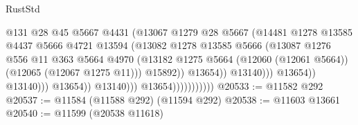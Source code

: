 \begin{lexlean}{RustStd}
\begin{coremodule}
                                                    @131
                                                    @28
                                                    @45
                                                    @5667
                                                    @4431
                                                    (@13067
                                                      @1279
                                                      @28
                                                      @5667
                                                      (@14481
                                                        @1278
                                                        @13585
                                                        @4437
                                                        @5666
                                                        @4721
                                                        @13594
                                                        (@13082
                                                          @1278
                                                          @13585
                                                          @5666
                                                          (@13087
                                                            @1276
                                                            @556
                                                            @11
                                                            @363
                                                            @5664
                                                            @4970
                                                            (@13182
                                                              @1275
                                                              @5664
                                                              (@12060 (@12061 @5664))
                                                              (@12065 (@12067 @1275 @11)))
                                                            @15892))
                                                        @13654))
                                                    @13140)))
                                              @13654))
                                          @13140)))
                                    @13654))
                                @13140)))
                          @13654)))))))))))
@20533 := @11582 @292
@20537 := @11584 (@11588 @292) (@11594 @292)
@20538 := @11603 @13661
@20540 := @11599 (@20538 @11618)

\end{coremodule}
\end{lexlean}
